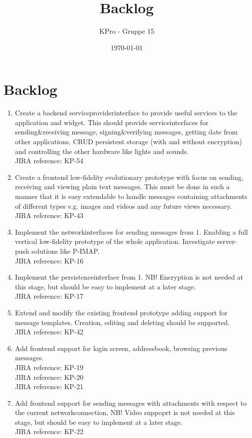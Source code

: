 \documentclass[a4paper, norsk, 12pt]{article}
\author{KPro - Gruppe 15}
\title{Backlog}
\date{\today}
\newcommand{\JIRA}[1]{\\JIRA reference: #1}
\begin{document}
	\maketitle
	\pagebreak
	\section{Backlog}
		\begin{enumerate}
			\item Create a backend serviceproviderinterface to provide useful services to the application and widget. 
				This should provide serviceinterfaces for sending\&receiving message, signing\&verifying messages, 
				getting date from other applications, CRUD persistent storage (with and without encryption) and 
				controlling the other hardware like lights and sounds. 
				\JIRA{KP-54}
				
			\item Create a frontend low-fidelity evolutionary prototype with focus on sending, receiving and viewing plain text messages. 
				This must be done in such a manner that it is easy extendable to handle messages containing attachments of different types e.g. images and videos and any future views necessary.
				\JIRA{KP-43}
				
			\item	Implement the networkinterfaces for sending messages from 1. 
				Enabling a full vertical low-fidelity prototype of the whole application.
				Investigate server-push solutions like P-IMAP.
				\JIRA{KP-16}
				
			\item Implement the persistenceinterface from 1. 
				NB! Encryption is not needed at this stage, but should be easy to implement at a later stage.
				\JIRA{KP-17}
				
			\item Extend and modify the existing frontend prototype adding support for message templates. 
				Creation, editing and deleting should be supported.
				\JIRA{KP-42}
				
			\item Add frontend support for login screen, addressbook, browsing previous messages. 
				\JIRA{KP-19}
				\JIRA{KP-20}
				\JIRA{KP-21}
			
			\item Add frontend support for sending messages with attachments with respect to the current networkconnection. 
				NB! Video suppoprt is not needed at this stage, but should be easy to implement at a later stage.
				\JIRA{KP-22}
				

\end{enumerate}
\end{document}
